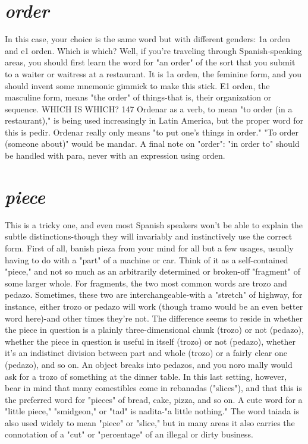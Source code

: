 \documentclass[14pt,a4paper,oneside]{memoir}
\begin{document}
\section{\emph{order}}

In this case, your choice is the same word but with different
genders: 1a orden and e1 orden. Which is which? Well, if you're traveling through Spanish-speaking areas, you should first learn the word for
"an order" of the sort that you submit to a waiter or waitress at a restaurant. It is 1a orden, the feminine form, and you should invent some
mnemonic gimmick to make this stick. E1 orden, the masculine form,
means "the order" of things-that is, their organization or sequence.
WHICH IS WHICH? 147
Ordenar as a verb, to mean "to order (in a restaurant)," is being used
increasingly in Latin America, but the proper word for this is pedir.
Ordenar really only means "to put one's things in order." "To order
(someone about)" would be mandar. A final note on "order": "in order
to" should be handled with para, never with an expression using
orden.

\section{\emph{piece}}

This is a tricky one, and even most Spanish speakers won't be
able to explain the subtle distinctions-though they will invariably
and instinctively use the correct form. First of all, banish pieza from
your mind for all but a few usages, usually having to do with a "part"
of a machine or car. Think of it as a self-contained "piece," and not so
much as an arbitrarily determined or broken-off "fragment" of some
larger whole.
For fragments, the two most common words are trozo and
pedazo. Sometimes, these two are interchangeable-with a "stretch"
of highway, for instance, either trozo or pedazo will work (though
tramo would be an even better word here)-and other times they're
not. The difference seems to reside in whether the piece in question is
a plainly three-dimensional chunk (trozo) or not (pedazo), whether the
piece in question is useful in itself (trozo) or not (pedazo), whether it's
an indistinct division between part and whole (trozo) or a fairly clear
one (pedazo), and so on. An object breaks into pedazos, and you noro mally would ask for a trozo of something at the dinner table.
In this last setting, however, bear in mind that many comestibles come in rebanadas ("slices"), and that this is the preferred word
for "pieces" of bread, cake, pizza, and so on. A cute word for a "little
piece," "smidgeon," or "tad" is nadita-"a little nothing." The word
taiada is also used widely to mean "piece" or "slice," but in many
areas it also carries the connotation of a "cut" or "percentage" of an
illegal or dirty business.
\end{document}
